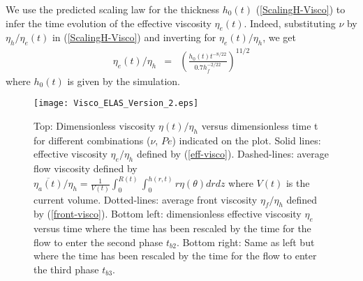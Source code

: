 We  use  the   predicted  scaling  law  for   the  thickness  $h_0(t)$
(\ref{ScalingH-Visco}) to  infer the  time evolution of  the effective
viscosity    $\eta_e(t)$.      Indeed,    substituting     $\nu$    by
$\eta_h/\eta_e(t)$   in  (\ref{ScalingH-Visco})   and  inverting   for
$\eta_e(t)/\eta_h$, we get
\begin{eqnarray}
  \eta_e(t)/\eta_h&=& \left(\frac{h_0(t)t^{-8/22}}{0.7 h_f^{-2/22}}\right)^{11/2}\label{eff-visco}
\end{eqnarray}
where $h_0(t)$ is given by the simulation.
\begin{figure}
  \begin{center}
    \graphicspath{ {/Users/thorey/Documents/These/Projet/Refroidissement/Skin_Model/Figure/JFM_V13/} }
    \texttt{[image: Visco\_ELAS\_Version\_2.eps]}
    \caption{Top:  Dimensionless   viscosity  $\eta(t)/\eta_h$  versus
      dimensionless time  t for  different combinations  ($\nu$, $Pe$)
      indicated  on  the  plot.    Solid  lines:  effective  viscosity
      $\eta_e/\eta_h$  defined  by  (\ref{eff-visco}).   Dashed-lines:
      average         flow         viscosity        defined         by
      $\overline{\eta_a(t)}/\eta_h                                   =
      \frac{1}{V(t)}\int_0^{R(t)}\int_0^{h(r,t)} r \eta(\theta) dr dz$
      where $V(t)$ is the current volume.  Dotted-lines: average front
      viscosity   $\eta_f/\eta_h$   defined  by   (\ref{front-visco}).
      Bottom left:  dimensionless effective viscosity  $\eta_e$ versus
      time where the  time has been rescaled by the  time for the flow
      to enter the second phase  $t_{b2}$.  Bottom right: Same as left
      but where the time has been rescaled by the time for the flow to
      enter the third phase $t_{b3}$.  }
    \label{Visco_ELAS_Version_2}
  \end{center}
\end{figure}

